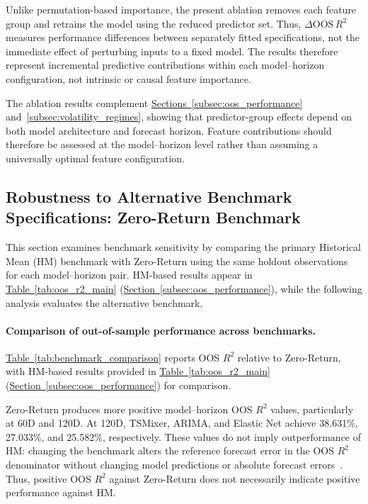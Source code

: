 \documentclass[runningheads,orivec]{llncs}
\makeatletter
\providecommand{\FloatBarrier}{\par\ifx\@deferlist\@empty\else\clearpage\fi}
\makeatother
\begin{document}
Unlike permutation-based importance, the present ablation removes each feature group and retrains the model using the reduced predictor set. Thus, $\Delta \mathrm{OOS}\,R^2$ measures performance differences between separately fitted specifications, not the immediate effect of perturbing inputs to a fixed model. The results therefore represent incremental predictive contributions within each model--horizon configuration, not intrinsic or causal feature importance.

The ablation results complement \hyperref[subsec:oos_performance]{Sections~\ref*{subsec:oos_performance}} and~\hyperref[subsec:volatility_regimes]{\ref*{subsec:volatility_regimes}}, showing that predictor-group effects depend on both model architecture and forecast horizon. Feature contributions should therefore be assessed at the model--horizon level rather than assuming a universally optimal feature configuration.

\FloatBarrier

\subsection{Robustness to Alternative Benchmark Specifications: Zero-Return Benchmark}\label{subsec:benchmark_robustness}

This section examines benchmark sensitivity by comparing the primary Historical Mean (HM) benchmark with Zero-Return using the same holdout observations for each model--horizon pair. HM-based results appear in \hyperref[tab:oos_r2_main]{Table~\ref*{tab:oos_r2_main}} (\hyperref[subsec:oos_performance]{Section~\ref*{subsec:oos_performance}}), while the following analysis evaluates the alternative benchmark.

\paragraph{Comparison of out-of-sample performance across benchmarks.}
\hyperref[tab:benchmark_comparison]{Table~\ref*{tab:benchmark_comparison}} reports OOS $R^2$ relative to Zero-Return, with HM-based results provided in \hyperref[tab:oos_r2_main]{Table~\ref*{tab:oos_r2_main}} (\hyperref[subsec:oos_performance]{Section~\ref*{subsec:oos_performance}}) for comparison.

Zero-Return produces more positive model--horizon OOS $R^2$ values, particularly at 60D and 120D. At 120D, TSMixer, ARIMA, and Elastic Net achieve 38.631\%, 27.033\%, and 25.582\%, respectively. These values do not imply outperformance of HM: changing the benchmark alters the reference forecast error in the OOS $R^2$ denominator without changing model predictions or absolute forecast errors~\cite{campbell2008,gu2020,welch2008}. Thus, positive OOS $R^2$ against Zero-Return does not necessarily indicate positive performance against HM.
\end{document}
